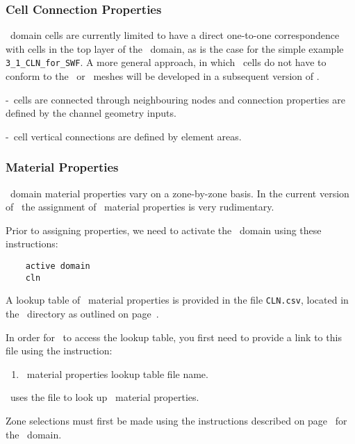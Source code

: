 \subsubsection{Cell Connection Properties}  

\cln\ domain cells are currently limited to have a direct one-to-one correspondence with cells in the top layer of the \gwf\ domain, as is the case for the simple example \texttt{3\_1\_CLN\_for\_SWF}.  A more general approach, in which \cln\ cells do not have to conform to the \gwf\ or \swf\ meshes will be developed in a subsequent version of \mut.

\cln-\cln\ cells are connected through neighbouring nodes and connection properties are defined by the channel geometry inputs.

\cln-\gwf\ cell vertical connections are defined by element areas.

\subsubsection{Material Properties}  
\cln\ domain material properties vary on a zone-by-zone basis.  In the current version of \mut\, the assignment of \cln\ material properties is very rudimentary.

Prior to assigning properties, we need to activate the \cln\ domain using these instructions:
\begin{verbatim}
    active domain
    cln
\end{verbatim}

A lookup table of \cln\ material properties  is provided in the file \texttt{CLN.csv}, located in the \bin\ directory as outlined on page~\pageref{page:userbin}.

In order for \mut\ to access the lookup table, you first need to provide a link to this file using the instruction:

    {
        \squish
        \begin{enumerate}
        \item {}  \cln\ material properties lookup table file name.
        \end{enumerate}
          \mut\ uses the file  to look up \cln\ material properties.
    }

Zone selections must first be made using the instructions described on page~\pageref{page:zoneSelect} for the \gwf\ domain.

